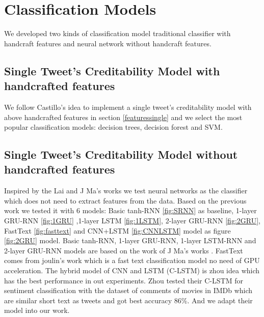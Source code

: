 \section{Classification Models} %
We developed two kinds of classification model traditional classifier with handcraft features and neural network without handcraft features.
\subsection{Single Tweet's Creditability Model with handcrafted features} %
We follow Castillo's \cite{gupta2014tweetcred} idea to implement a single tweet's creditability model with above handcrafted features in section \ref{featuressingle} and we select the most popular classification models: decision trees, decision forest and SVM.  

  \subsection{Single Tweet's Creditability Model without handcrafted features} 
\label{sec:single_nofeature}

 Inspired by the Lai and J Ma's works \cite{lai2015recurrent} \cite{madetecting} we test neural networks as the classifier which does not need to extract features from the data.
Based on the previous work we tested it with 6 models: Basic tanh-RNN \ref{fig:SRNN} as baseline, 1-layer GRU-RNN \ref{fig:1GRU} ,1-layer LSTM \ref{fig:1LSTM}, 2-layer GRU-RNN \ref{fig:2GRU}, FastText \ref{fig:fasttext} and CNN+LSTM \ref{fig:CNNLSTM}  model  as figure \ref{fig:2GRU} model. Basic tanh-RNN, 1-layer GRU-RNN, 1-layer LSTM-RNN and 2-layer GRU-RNN models are based on the work of J Ma's works \cite{madetecting}. FastText comes from joulin's work  \cite{joulin2016bag} which is a fast text classification model no need of GPU acceleration. The hybrid model of CNN and LSTM (C-LSTM) is zhou idea \cite{zhou2015c} which has the best performance in out experiments. Zhou tested their C-LSTM for sentiment classification with the dataset of comments of movies in IMDb which are similar short text as tweets and got best accuracy 86\%. And we adapt their model into our work.

